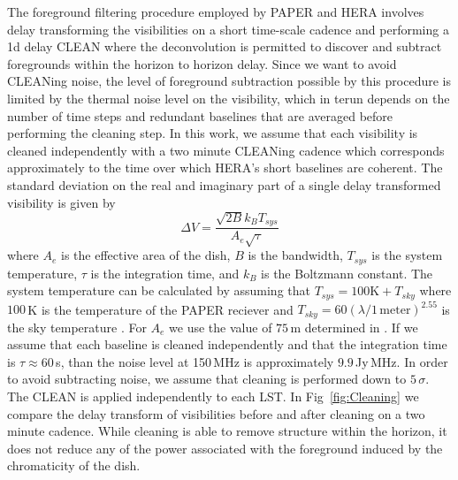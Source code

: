 \documentclass[twocolumn]{emulateapj}
\begin{document}
The foreground filtering procedure employed by PAPER and HERA involves delay transforming the visibilities on a short time-scale cadence and performing a 1d delay CLEAN where the deconvolution is permitted to discover and subtract foregrounds within the horizon to horizon delay. Since we want to avoid CLEANing noise, the level of foreground subtraction possible by this procedure is limited by the thermal noise level on the visibility, which in terun depends on the number of time steps and redundant baselines that are averaged before performing the cleaning step. In this work, we assume that each visibility is cleaned independently with a two minute CLEANing cadence which corresponds approximately to the time over which HERA's short baselines are coherent. The standard deviation on the real and imaginary part of a single delay transformed visibility is given by \citep{Morales:2004}
\begin{equation}
\Delta V = \frac{\sqrt{2 B} k_B T_{sys}}{A_e \sqrt{\tau}}
\end{equation}
where $A_e$ is the effective area of the dish, $B$ is the bandwidth, $T_{sys}$ is the system temperature, $\tau$ is the integration time, and $k_B$ is the Boltzmann constant. The system temperature can be calculated by assuming that $T_{sys} = 100\text{K} + T_{sky}$ where $100$\,K is the temperature of the PAPER reciever and $T_{sky} = 60 (\lambda/1\,\text{meter} )^{2.55}$ is the sky temperature \citep{Fixsen:2008}. For $A_e$ we use the value of $75$\,m determined in \citep{Neben:2015b}. If we assume that each baseline is cleaned independently and that the integration time is $\tau \approx 60$\,s, than the noise level at 150\,MHz is approximately $9.9$\,Jy\,MHz. In order to avoid subtracting noise, we assume that cleaning is performed down to $5\,\sigma$. The CLEAN is applied  independently to each LST. In Fig~\ref{fig:Cleaning} we compare the delay transform of visibilities before and after cleaning on a two minute cadence. While cleaning is able to remove structure within the horizon, it does not reduce any of the power associated with the foreground induced by the chromaticity of the dish. 
\end{document}
